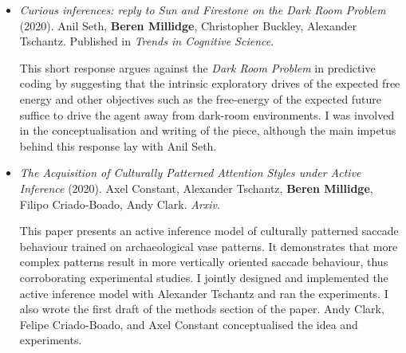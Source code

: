 \begin{itemize}

\item \emph{Curious inferences: reply to Sun and Firestone on the Dark Room Problem} (2020). Anil Seth, \textbf{Beren Millidge}, Christopher Buckley, Alexander Tschantz. Published in \emph{Trends in Cognitive Science}. 

This short response argues against the \emph{Dark Room Problem} in predictive coding by suggesting that the intrinsic exploratory drives of the expected free energy and other objectives such as the free-energy of the expected future suffice to drive the agent away from dark-room environments. I was involved in the conceptualisation and writing of the piece, although the main impetus behind this response lay with Anil Seth.

\item \emph{The Acquisition of Culturally Patterned Attention Styles under Active Inference} (2020). Axel Constant, Alexander Tschantz, \textbf{Beren Millidge}, Filipo Criado-Boado, Andy Clark. \emph{Arxiv}.

This paper presents an active inference model of culturally patterned saccade behaviour trained on archaeological vase patterns. It demonstrates that more complex patterns result in more vertically oriented saccade behaviour, thus corroborating experimental studies. I jointly designed and implemented the active inference model with Alexander Tschantz and ran the experiments. I also wrote the first draft of the methods section of the paper. Andy Clark, Felipe Criado-Boado, and Axel Constant conceptualised the idea and experiments.





\end{itemize}

